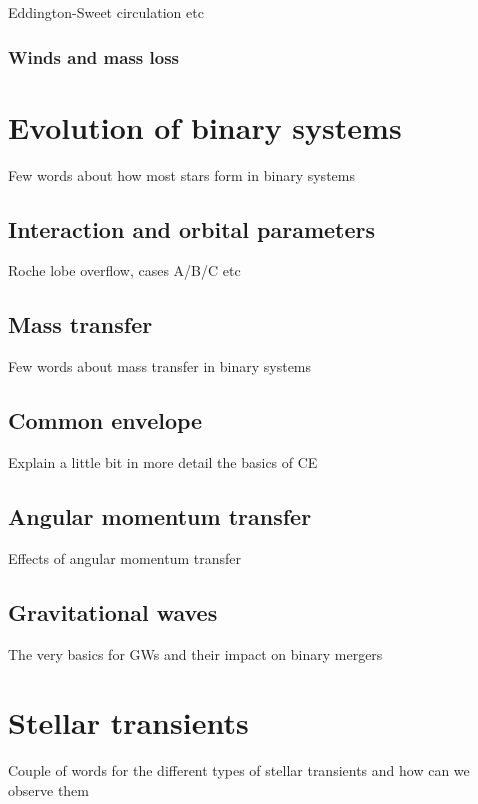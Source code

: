 \documentclass[../../main/thesis_msc.tex]{subfiles}
\begin{document}
						Eddington-Sweet circulation etc
						
					\subsubsection{Winds and mass loss}
				
	\section{Evolution of binary systems}
	
		Few words about how most stars form in binary systems
		
			\subsection{Interaction and orbital parameters}
			
				Roche lobe overflow, cases A/B/C etc
				
			\subsection{Mass transfer}
			
				Few words about mass transfer in binary systems
				
			\subsection{Common envelope}
			
				Explain a little bit in more detail the basics of CE
				
			\subsection{Angular momentum transfer}
			
				Effects of angular momentum transfer
				
			\subsection{Gravitational waves}
			
				The very basics for GWs and their impact on binary mergers
				
	\section{Stellar transients}
	
		Couple of words for the different types of stellar transients and how can we observe them
		
\end{document}
